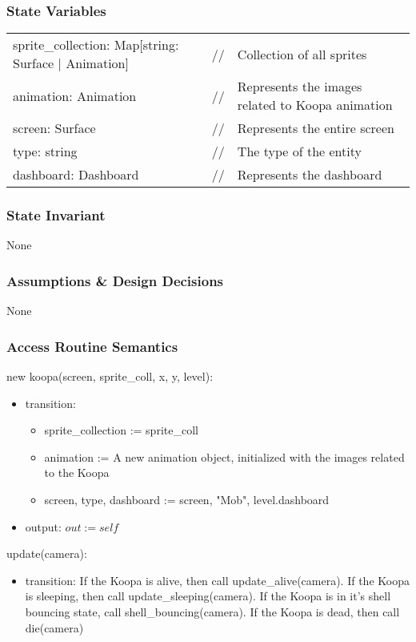 \documentclass[12pt]{article}
\begin{document}
\subsubsection* {State Variables}
\begin{tabular}{lll}
sprite\_collection: Map[string: Surface | Animation] & // & Collection of all sprites\\
animation: Animation & // & Represents the images related to Koopa animation\\
screen: Surface & // & Represents the entire screen\\
type: string & // & The type of the entity\\
dashboard: Dashboard & // & Represents the dashboard\\
\end{tabular}

\subsubsection* {State Invariant}

None

\subsubsection* {Assumptions \& Design Decisions}

None

\subsubsection* {Access Routine Semantics}

new koopa(screen, sprite\_coll, x, y, level):
\begin{itemize}
    \item transition: 
    \begin{itemize}[]
        \item sprite\_collection := sprite\_coll
        \item animation := A new animation object, initialized with the images related to the Koopa
        \item screen, type, dashboard := screen, "Mob", level.dashboard
    \end{itemize}
    \item output: $out := self$
\end{itemize}

update(camera):
\begin{itemize}
    \item transition: If the Koopa is alive, then call update\_alive(camera). If the Koopa is sleeping, then call update\_sleeping(camera). If the Koopa is in it's shell bouncing state, call shell\_bouncing(camera). If the Koopa is dead, then call die(camera)
\end{itemize}
\end{document}
